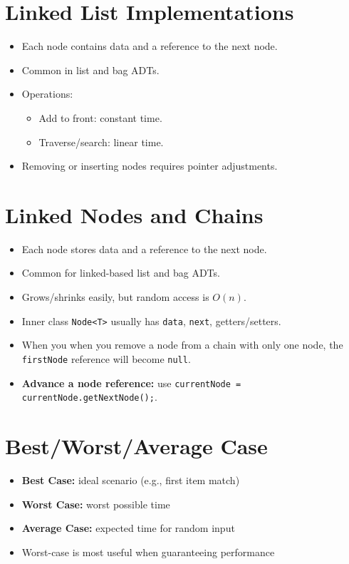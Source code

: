\documentclass[11pt]{article}
\begin{document}
\hrulefill

\section*{Linked List Implementations}
\begin{itemize}
  \item Each node contains data and a reference to the next node.
  \item Common in list and bag ADTs.
  \item Operations:
  \begin{itemize}
    \item Add to front: constant time.
    \item Traverse/search: linear time.
  \end{itemize}
  \item Removing or inserting nodes requires pointer adjustments.
\end{itemize}

\hrulefill

\section*{Linked Nodes and Chains}
\begin{itemize}[leftmargin=*]
\item Each node stores data and a reference to the next node.
\item Common for linked-based list and bag ADTs.
\item Grows/shrinks easily, but random access is $O(n)$.
\item Inner class \texttt{Node<T>} usually has \texttt{data}, 
\texttt{next}, getters/setters.
\item When you when you remove a node from a chain with only one node, the \texttt{firstNode} reference will become \texttt{null}.
\item \textbf{Advance a node reference:} use \verb|currentNode = currentNode.getNextNode();|.
\end{itemize}

\hrulefill

\section*{Best/Worst/Average Case}
\begin{itemize}[leftmargin=*]
\item \textbf{Best Case:} ideal scenario (e.g., first item match)
\item \textbf{Worst Case:} worst possible time
\item \textbf{Average Case:} expected time for random input
\item Worst-case is most useful when guaranteeing performance
\end{itemize}
\end{document}
